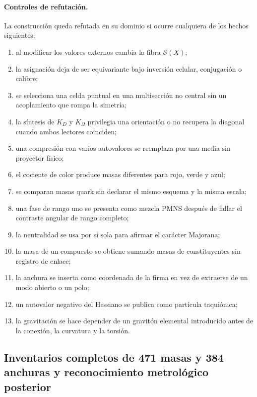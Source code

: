 \paragraph{Controles de refutación.}

La construcción queda refutada en su dominio si ocurre cualquiera de los
hechos siguientes:

\begin{enumerate}
\item al modificar los valores externos cambia la fibra \(\mathscr S(X)\);
\item la asignación deja de ser equivariante bajo inversión celular,
      conjugación o calibre;
\item se selecciona una celda puntual en una multisección no central sin un
      acoplamiento que rompa la simetría;
\item la síntesis de \(K_D\) y \(K_\Omega\) privilegia una orientación o no
      recupera la diagonal cuando ambos lectores coinciden;
\item una compresión con varios autovalores se reemplaza por una media sin
      proyector físico;
\item el cociente de color produce masas diferentes para rojo, verde y azul;
\item se comparan masas quark sin declarar el mismo esquema y la misma escala;
\item una fase de rango uno se presenta como mezcla PMNS después de fallar el
      contraste angular de rango completo;
\item la neutralidad se usa por sí sola para afirmar el carácter Majorana;
\item la masa de un compuesto se obtiene sumando masas de constituyentes sin
      registro de enlace;
\item la anchura se inserta como coordenada de la firma en vez de extraerse de
      un modo abierto o un polo;
\item un autovalor negativo del Hessiano se publica como partícula taquiónica;
\item la gravitación se hace depender de un gravitón elemental introducido
      antes de la conexión, la curvatura y la torsión.
\end{enumerate}

\subsection{Inventarios completos de 471 masas y 384 anchuras y reconocimiento metrológico posterior}

